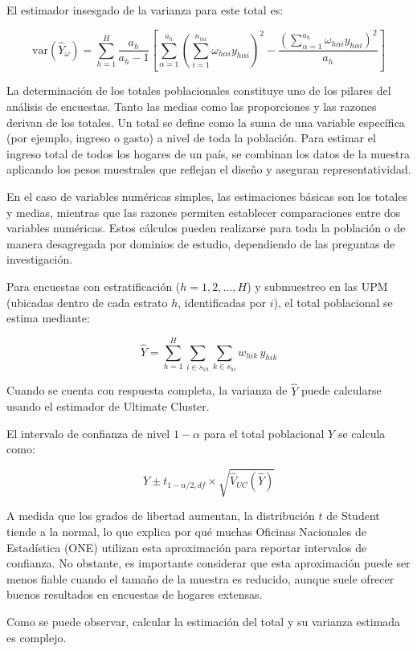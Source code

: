 \documentclass[
  spanish,
  12pt,
]{book}
\begin{document}
El estimador insesgado de la varianza para este total es:

\[
\text{var}\left(\hat{Y}_{\omega}\right) = \sum_{h=1}^{H} \frac{a_h}{a_h - 1} \left[ \sum_{\alpha=1}^{a_h} \left( \sum_{i=1}^{n_{h\alpha}} \omega_{h\alpha i} y_{h\alpha i} \right)^2 - \frac{\left( \sum_{\alpha=1}^{a_h} \omega_{h\alpha i} y_{h\alpha i} \right)^2}{a_h} \right]
\]

La determinación de los totales poblacionales constituye uno de los pilares del análisis de encuestas. Tanto las medias como las proporciones y las razones derivan de los totales. Un total se define como la suma de una variable específica (por ejemplo, ingreso o gasto) a nivel de toda la población. Para estimar el ingreso total de todos los hogares de un país, se combinan los datos de la muestra aplicando los pesos muestrales que reflejan el diseño y aseguran representatividad.

En el caso de variables numéricas simples, las estimaciones básicas son los totales y medias, mientras que las razones permiten establecer comparaciones entre dos variables numéricas. Estos cálculos pueden realizarse para toda la población o de manera desagregada por dominios de estudio, dependiendo de las preguntas de investigación.

Para encuestas con estratificación (\(h=1,2,...,H\)) y submuestreo en las UPM (ubicadas dentro de cada estrato \(h\), identificadas por \(i\)), el total poblacional se estima mediante:

\[
\hat{Y} = \sum_{h=1}^{H} \sum_{i \in s_{1h}} \sum_{k \in s_{hi}} w_{hik} \, y_{hik}
\]

Cuando se cuenta con respuesta completa, la varianza de \(\hat{Y}\) puede calcularse usando el estimador de Ultimate Cluster.

El intervalo de confianza de nivel \(1-\alpha\) para el total poblacional \(Y\) se calcula como:

\[
\hat{Y} \pm t_{1-\alpha/2, df} \times \sqrt{\hat{V}_{UC}(\hat{Y})}
\]

A medida que los grados de libertad aumentan, la distribución \(t\) de Student tiende a la normal, lo que explica por qué muchas Oficinas Nacionales de Estadística (ONE) utilizan esta aproximación para reportar intervalos de confianza. No obstante, es importante considerar que esta aproximación puede ser menos fiable cuando el tamaño de la muestra es reducido, aunque suele ofrecer buenos resultados en encuestas de hogares extensas.

Como se puede observar, calcular la estimación del total y su varianza estimada es complejo.
\end{document}
